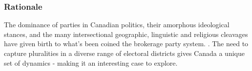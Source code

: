 \subsubsection{Rationale}

The dominance of parties in Canadian politics, their amorphous ideological
stances, and the many intersectional geographic, linguistic and religious
cleavages have given birth to what’s been coined the brokerage party system.
\cite{carty2010political}. The need to capture pluralities in a diverse range of
electoral districts gives Canada a unique set of dynamics - making it an
interesting case to explore.